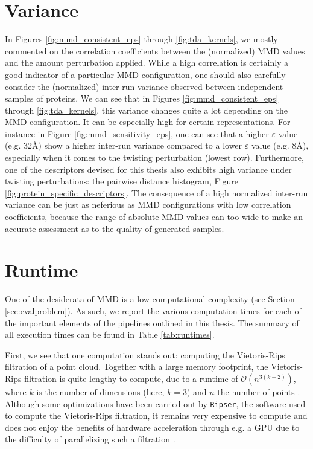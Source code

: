 \section{Variance}

In Figures \ref{fig:mmd_consistent_eps} through \ref{fig:tda_kernels}, we mostly
commented on the correlation coefficients between the (normalized) MMD values
and the amount perturbation applied. While a high correlation is certainly a
good indicator of a particular MMD configuration, one should also carefully
consider the (normalized) inter-run variance observed between independent
samples of proteins. We can see that in Figures \ref{fig:mmd_consistent_eps}
through \ref{fig:tda_kernels}, this variance changes quite a lot depending on
the MMD configuration. It can be especially high for certain representations.
For instance in Figure \ref{fig:mmd_sensitivity_eps}, one can see that a higher
$\varepsilon$ value (e.g. 32\si{\angstrom}) show a higher inter-run variance
compared to a lower $\varepsilon$ value (e.g. 8\si{\angstrom}), especially when
it comes to the twisting perturbation (lowest row). Furthermore, one of the
descriptors devised for this thesis also exhibits high variance under twisting
perturbations: the pairwise distance histogram, Figure
\ref{fig:protein_specific_descriptors}. The consequence of a high normalized
inter-run variance can be just as neferious as MMD configurations with low
correlation coefficients, because the range of absolute MMD values can too wide
to make an accurate assessment as to the quality of generated samples.


\section{Runtime}\label{sec:results_runtime}

One of the desiderata of MMD is a low computational complexity (see Section
\ref{sec:evalproblem}). As such, we report the various computation times for
each of the important elements of the pipelines outlined in this thesis. The
summary of all execution times can be found in Table \ref{tab:runtimes}.

First, we see that one computation stands out: computing the Vietoris-Rips
filtration of a point cloud. Together with a large memory footprint, the
Vietoris-Rips filtration is quite lengthy to compute, due to a runtime of
$\mathcal{O}(n^{3(k+2)})$, where $k$ is the number of dimensions (here, $k=3$)
and $n$ the number of points \citep{adams2018persistent}. Although some optimizations have been carried out
by \texttt{Ripser}, the software used to compute the Vietoris-Rips filtration,
it remains very expensive to compute and does not enjoy the benefits of hardware
acceleration through e.g. a GPU due to the difficulty of parallelizing such a
filtration \citep{Bauer2021Ripser}.

